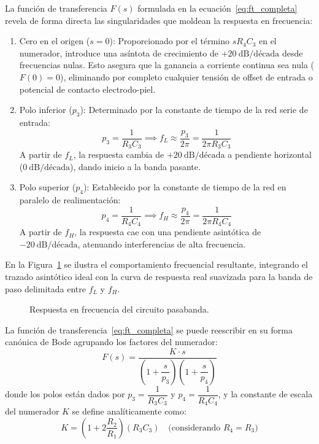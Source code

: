 La función de transferencia $F(s)$ formulada en la ecuación~\eqref{eq:ft_completa} revela de forma directa las singularidades
que moldean la respuesta en frecuencia:
\begin{enumerate}
  \item Cero en el origen ($s = 0$): Proporcionado por el término $s R_4 C_3$ en el numerador, introduce una asíntota de
  crecimiento de $+20\ \text{dB/década}$ desde frecuencias nulas. Esto asegura que la ganancia a corriente continua sea
  nula ($F(0) = 0$), eliminando por completo cualquier tensión de offset de entrada o potencial de contacto electrodo-piel.
  \item Polo inferior ($p_3$): Determinado por la constante de tiempo de la red serie de entrada:
  \begin{equation*}
    p_3 = \frac{1}{R_3 C_3} \implies f_L \approx \frac{p_3}{2 \pi} = \frac{1}{2 \pi R_3 C_3}
  \end{equation*}
  A partir de $f_L$, la respuesta cambia de $+20\ \text{dB/década}$ a pendiente horizontal ($0\ \text{dB/década}$),
  dando inicio a la banda pasante.
  \item Polo superior ($p_4$): Establecido por la constante de tiempo de la red en paralelo de realimentación:
  \begin{equation*}
    p_4 = \frac{1}{R_4 C_4} \implies f_H \approx \frac{p_4}{2 \pi} = \frac{1}{2 \pi R_4 C_4}
  \end{equation*}
  A partir de $f_H$, la respuesta cae con una pendiente asintótica de $-20\ \text{dB/década}$, atenuando interferencias de
  alta frecuencia.
\end{enumerate}

En la Figura~\ref{plot:bode_teorico} se ilustra el comportamiento frecuencial resultante, integrando el trazado asintótico ideal con la curva de respuesta real suavizada para la banda de paso delimitada entre $f_L$ y $f_H$.

\begin{figure}[!ht]
  \centering
  \resizebox{0.82\textwidth}{!}{%
  }
  \caption{Respuesta en frecuencia del circuito pasabanda.}
  \label{plot:bode_teorico}
\end{figure}

La función de transferencia~\eqref{eq:ft_completa} se puede reescribir en su forma canónica de Bode agrupando los factores del numerador:
\begin{equation*}
  F(s) = \frac{K \cdot s}{\left(1 + \dfrac{s}{p_3}\right)\left(1 + \dfrac{s}{p_4}\right)}
\end{equation*}
donde los polos están dados por $p_3 = \dfrac{1}{R_3 C_3}$ y $p_4 = \dfrac{1}{R_4 C_4}$, y la constante de escala del numerador $K$ se define analíticamente como:
\begin{equation}
    K = \left(1 + 2 \frac{R_2}{R_1}\right) (R_3 C_3) \quad \mbox{(considerando $R_4 = R_3$)}
    \label{eq:definicion_k}
\end{equation}


